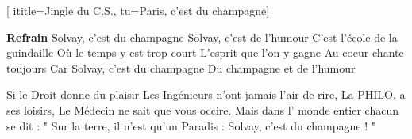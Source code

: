  [
ititle={Jingle du C.S.}, 
tu={Paris, c'est du champagne}]

\beginchorus
\textbf{Refrain}
Solvay, c'est du champagne
Solvay, c'est de l'humour
C'est l'école de la guindaille
Où le temps y est trop court
L'esprit que l'on y gagne
Au coeur chante toujours
Car Solvay, c'est du champagne
Du champagne et de l'humour
\endchorus

\beginverse
Si le Droit donne du plaisir
Les Ingénieurs n'ont jamais l'air de rire,
La PHILO. a ses loisirs,
Le Médecin ne sait que vous occire.
Mais dans l' monde entier chacun se dit :
" Sur la terre, il n'est qu'un Paradis :
Solvay, c'est du champagne ! "
\endverse
\endsong